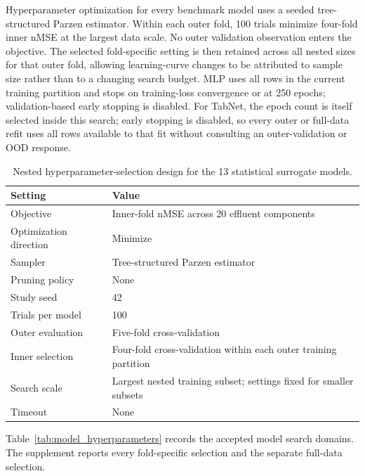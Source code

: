 \documentclass[a4paper,fleqn]{cas-sc}
\begin{document}
Hyperparameter optimization for every benchmark model uses a seeded tree-structured Parzen estimator. Within each outer fold, 100 trials minimize four-fold inner nMSE at the largest data scale. No outer validation observation enters the objective. The selected fold-specific setting is then retained across all nested sizes for that outer fold, allowing learning-curve changes to be attributed to sample size rather than to a changing search budget. MLP uses all rows in the current training partition and stops on training-loss convergence or at 250 epochs; validation-based early stopping is disabled. For TabNet, the epoch count is itself selected inside this search; early stopping is disabled, so every outer or full-data refit uses all rows available to that fit without consulting an outer-validation or OOD response.

\begin{table}[htbp]
\centering
\caption{Nested hyperparameter-selection design for the 13 statistical surrogate models.}
\label{tab:optuna_design}
\scriptsize
\begin{tabular}{ll}
\hline
Setting & Value \\
\hline
Objective & Inner-fold nMSE across 20 effluent components \\
Optimization direction & Minimize \\
Sampler & Tree-structured Parzen estimator \\
Pruning policy & None \\
Study seed & 42 \\
Trials per model & 100 \\
Outer evaluation & Five-fold cross-validation \\
Inner selection & Four-fold cross-validation within each outer training partition \\
Search scale & Largest nested training subset; settings fixed for smaller subsets \\
Timeout & None \\
\hline
\end{tabular}
\end{table}

Table~\ref{tab:model_hyperparameters} records the accepted model search domains. The supplement reports every fold-specific selection and the separate full-data selection.
\end{document}
